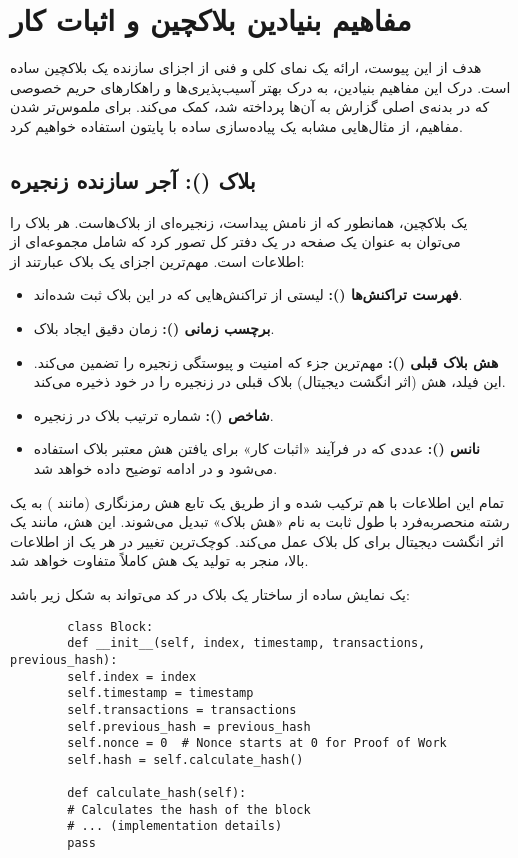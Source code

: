 \chapter{مفاهیم بنیادین بلاکچین و اثبات کار}
\label{chap:appendix_basics}

هدف از این پیوست، ارائه یک نمای کلی و فنی از اجزای سازنده یک بلاکچین ساده است. درک این مفاهیم بنیادین، به درک بهتر آسیب‌پذیری‌ها و راهکارهای حریم خصوصی که در بدنه‌ی اصلی گزارش به آن‌ها پرداخته شد، کمک می‌کند. برای ملموس‌تر شدن مفاهیم، از مثال‌هایی مشابه یک پیاده‌سازی ساده با پایتون استفاده خواهیم کرد.

\section{بلاک (): آجر سازنده زنجیره}

یک بلاکچین، همانطور که از نامش پیداست، زنجیره‌ای از بلاک‌هاست. هر بلاک را می‌توان به عنوان یک صفحه در یک دفتر کل تصور کرد که شامل مجموعه‌ای از اطلاعات است. مهم‌ترین اجزای یک بلاک عبارتند از:
\begin{itemize}
	\item \textbf{فهرست تراکنش‌ها ():} لیستی از تراکنش‌هایی که در این بلاک ثبت شده‌اند.
	\item \textbf{برچسب زمانی ():} زمان دقیق ایجاد بلاک.
	\item \textbf{هش بلاک قبلی ():} مهم‌ترین جزء که امنیت و پیوستگی زنجیره را تضمین می‌کند. این فیلد، هش (اثر انگشت دیجیتال) بلاک قبلی در زنجیره را در خود ذخیره می‌کند.
	\item \textbf{شاخص ():} شماره ترتیب بلاک در زنجیره.
	\item \textbf{نانس ():} عددی که در فرآیند «اثبات کار» برای یافتن هش معتبر بلاک استفاده می‌شود و در ادامه توضیح داده خواهد شد.
\end{itemize}

تمام این اطلاعات با هم ترکیب شده و از طریق یک تابع هش رمزنگاری (مانند ) به یک رشته منحصربه‌فرد با طول ثابت به نام «هش بلاک» تبدیل می‌شوند. این هش، مانند یک اثر انگشت دیجیتال برای کل بلاک عمل می‌کند. کوچک‌ترین تغییر در هر یک از اطلاعات بالا، منجر به تولید یک هش کاملاً متفاوت خواهد شد.

یک نمایش ساده از ساختار یک بلاک در کد می‌تواند به شکل زیر باشد:
\begin{latin}
	\begin{lstlisting}
		class Block:
		def __init__(self, index, timestamp, transactions, previous_hash):
		self.index = index
		self.timestamp = timestamp
		self.transactions = transactions
		self.previous_hash = previous_hash
		self.nonce = 0  # Nonce starts at 0 for Proof of Work
		self.hash = self.calculate_hash()
		
		def calculate_hash(self):
		# Calculates the hash of the block
		# ... (implementation details)
		pass
	\end{lstlisting}
\end{latin}

